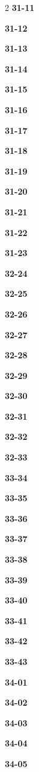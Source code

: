 \documentclass[10pt,a4paper]{article}
\begin{document}
\begin{multicols}{2}
\noindent\textbf{31-11}\ \par
\noindent\textbf{31-12}\ \par
\noindent\textbf{31-13}\ \par
\noindent\textbf{31-14}\ \par
\noindent\textbf{31-15}\ \par
\noindent\textbf{31-16}\ \par
\noindent\textbf{31-17}\ \par
\noindent\textbf{31-18}\ \par
\noindent\textbf{31-19}\ \par
\noindent\textbf{31-20}\ \par
\noindent\textbf{31-21}\ \par
\noindent\textbf{31-22}\ \par
\noindent\textbf{31-23}\ \par
\noindent\textbf{32-24}\ \par
\noindent\textbf{32-25}\ \par
\noindent\textbf{32-26}\ \par
\noindent\textbf{32-27}\ \par
\noindent\textbf{32-28}\ \par
\noindent\textbf{32-29}\ \par
\noindent\textbf{32-30}\ \par
\noindent\textbf{32-31}\ \par
\noindent\textbf{32-32}\ \par
\noindent\textbf{32-33}\ \par
\noindent\textbf{33-34}\ \par
\noindent\textbf{33-35}\ \par
\noindent\textbf{33-36}\ \par
\noindent\textbf{33-37}\ \par
\noindent\textbf{33-38}\ \par
\noindent\textbf{33-39}\ \par
\noindent\textbf{33-40}\ \par
\noindent\textbf{33-41}\ \par
\noindent\textbf{33-42}\ \par
\noindent\textbf{33-43}\ \par
\noindent\textbf{34-01}\ \par
\noindent\textbf{34-02}\ \par
\noindent\textbf{34-03}\ \par
\noindent\textbf{34-04}\ \par
\noindent\textbf{34-05}\ \par

\end{multicols}
\end{document}
